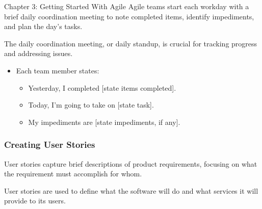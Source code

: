\begin{notes}{Chapter 3: Getting Started With Agile}
    Agile teams start each workday with a brief daily coordination meeting to note completed items, identify impediments, and plan the day's tasks.
    
    \begin{highlight}
    
        The daily coordination meeting, or daily standup, is crucial for tracking progress and addressing issues.
        
        \begin{itemize}
            \item Each team member states:
            \begin{itemize}
                \item Yesterday, I completed [state items completed].
                \item Today, I'm going to take on [state task].
                \item My impediments are [state impediments, if any].
            \end{itemize}
        \end{itemize}
    
    \end{highlight}
    
    \subsubsection*{Creating User Stories}
    
    User stories capture brief descriptions of product requirements, focusing on what the requirement must accomplish for whom.
    
    \begin{highlight}
    
        User stories are used to define what the software will do and what services it will provide to its users.
        

\end{highlight}
\end{notes}
